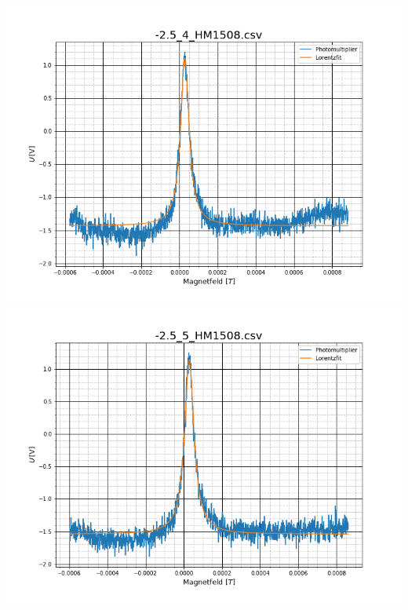 \begin{center}
\includegraphics[scale=0.3]{Bild/Anhang/Statistik/stat5}
\includegraphics[scale=0.3]{Bild/Anhang/Statistik/stat6}\\


\end{center}
